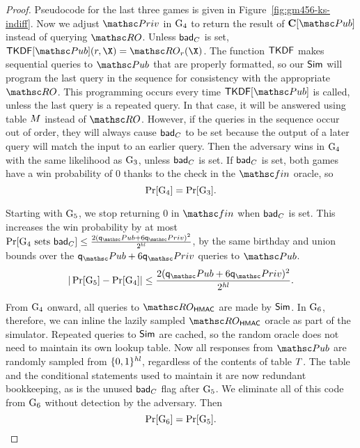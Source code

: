 \begin{proof}
	Pseudocode for the last three games is given in Figure~\ref{fig:gm456-ks-indiff}.
	Now we adjust $\PrivO$ in $\textnormal{G}_4$ to return the result of $\construct{C}[\PubO]$ instead of querying $\RO$. 
	Unless $\mathsf{bad}_C$ is set, $\TLSKDF[\PubO](\roIndex, \X) = \RO_{\roIndex}( \X)$. 
	The function $\mathsf{TKDF}$ makes sequential queries to $\PubO$ that are properly formatted, so our $\mathsf{Sim}$ will program the last query in the sequence for consistency with the appropriate $\RO$. 
	This programming occurs every time $\TLSKDF[\PubO]$ is called, unless the last query is a repeated query.
	In that case, it will be answered using table $M$ instead of $\RO$.
	However, if the queries in the sequence occur out of order, they will always cause $\mathsf{bad}_C$ to be set because the output of a later query will match the input to an earlier query.
	Then the adversary wins in $\textnormal{G}_4$ with the same likelihood as $\textnormal{G}_3$, unless $\mathsf{bad}_C$ is set. 
	If $\mathsf{bad}_C$ is set, both games have a win probability of $0$ thanks to the check in the $\Finalize$ oracle, so
	\[\Pr[\textnormal{G}_4] = \Pr[\textnormal{G}_3].\]
	
	Starting with $\textnormal{G}_5$, we stop returning $0$ in $\Finalize$ when $\mathsf{bad}_C$ is set. This increases the win probability by at most $\Pr[\Gm_4 \text{ sets }\bad_C] \leq \frac{2(\qPub+6\qPriv)^2}{2^{\hashlen}}$, by the same birthday and union bounds over the $\qPub + 6\qPriv$ queries to $\PubO$. 
	\[|\Pr[\Gm_5] - \Pr[\Gm_4]| \leq \frac{2(\qPub+6\qPriv)^2}{2^{\hashlen}}.\]
	
	From $\textnormal{G}_4$ onward, all queries to $\ROhmac$ are made by $\mathsf{Sim}$. In $\textnormal{G}_6$, therefore, we can inline the lazily sampled $\ROhmac$ oracle as part of the simulator. 
	Repeated queries to $\mathsf{Sim}$ are cached, so the random oracle does not need to maintain its own lookup table. 
	Now all responses from $\PubO$ are randomly sampled from $\{0,1\}^{\mathit{hl}}$, regardless of the contents of table $T$. 
	The table and the conditional statements used to maintain it are now redundant bookkeeping, as is the unused $\mathsf{bad}_C$ flag after $\textnormal{G}_5$. 
	We eliminate all of this code from $\textnormal{G}_6$ without detection by the adversary.
	Then 
	\[ \Pr[\textnormal{G}_6] = \Pr[\textnormal{G}_5]. \]
	

\end{proof}
